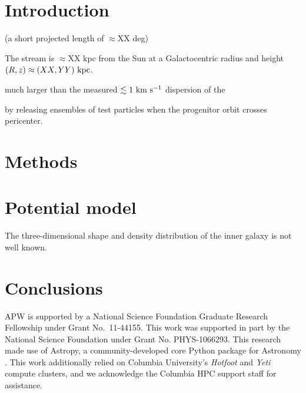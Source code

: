 \documentclass[letterpaper,12pt,preprint]{aastex}
\begin{document}

\section{Introduction}\label{sec:introduction}

(a short projected length of $\approx$XX deg)

The stream is $\approx$XX kpc from the Sun at a Galactocentric radius and height $(R,z) \approx (XX, YY)~{\rm kpc}$.

much larger than the measured $\lesssim 1~{\rm km}~{\rm s}^{-1}$ dispersion of the 

by releasing ensembles of test particles when the progenitor orbit crosses pericenter.

\section{Methods}\label{sec:method}

\section{Potential model}\label{sec:potential}

The three-dimensional shape and density distribution of the inner galaxy is not well known. 

\section{Conclusions}\label{sec:conclusions}

\acknowledgements
APW is supported by a National Science Foundation Graduate Research Fellowship under Grant No.\ 11-44155.
This work was supported in part by the National Science Foundation under Grant No. PHYS-1066293.
This research made use of Astropy, a community-developed core Python package for Astronomy \citep{astropy13}.
This work additionally relied on Columbia University's \emph{Hotfoot} and \emph{Yeti} compute clusters, and we acknowledge the Columbia HPC support staff for assistance. \\

%
%
\end{document}
